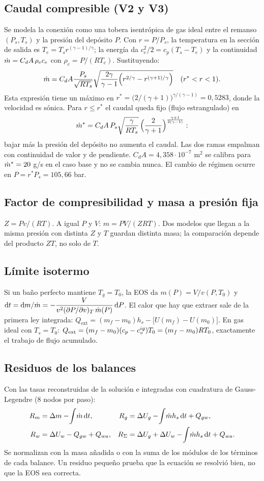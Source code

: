 \subsection{Caudal compresible (V2 y V3)}
Se modela la conexión como una tobera isentrópica de gas ideal entre el remanso $(P_s,T_s)$ y la presión
del depósito $P$. Con $r=P/P_s$, la temperatura en la sección de salida es $T_e=T_sr^{(\gamma-1)/\gamma}$; la
energía da $c_e^2/2=c_p(T_s-T_e)$ y la continuidad $\dot m=C_dA\,\rho_ec_e$ con $\rho_e=P/(RT_e)$. Sustituyendo:
\begin{equation}\label{eq:caudal}
\dot m=C_dA\frac{P_s}{\sqrt{RT_s}}\sqrt{\frac{2\gamma}{\gamma-1}\Big(r^{2/\gamma}-r^{(\gamma+1)/\gamma}\Big)}\quad (r^*<r<1).
\end{equation}
Esta expresión tiene un máximo en $r^*=\big(2/(\gamma+1)\big)^{\gamma/(\gamma-1)}=0{,}5283$, donde la velocidad
es sónica. Para $r\le r^*$ el caudal queda fijo (flujo estrangulado) en
\[
\dot m^*=C_dA\,P_s\sqrt{\frac{\gamma}{RT_s}}\,\Big(\frac{2}{\gamma+1}\Big)^{\frac{\gamma+1}{2(\gamma-1)}} :
\]
bajar más la presión del depósito no aumenta el caudal. Las dos ramas empalman con continuidad de valor y
de pendiente. $C_dA=4{,}358\cdot10^{-7}$ m$^2$ se calibra para $\dot m^*=20$ g/s en el caso base y no se cambia
nunca. El cambio de régimen ocurre en $P=r^*P_s=105{,}66$ bar.

\subsection{Factor de compresibilidad y masa a presión fija}
$Z=Pv/(RT)$. A igual $P$ y $V$: $m=PV/(ZRT)$. Dos modelos que llegan a la misma presión con distinta
$Z$ y $T$ guardan distinta masa; la comparación depende del producto $ZT$, no solo de $T$.

\subsection{Límite isotermo}
Si un baño perfecto mantiene $T_g=T_0$, la EOS da $m(P)=V/v(P,T_0)$ y
$\mathrm{d} t=\mathrm{d} m/\dot m=-\dfrac{V}{v^2(\partial P/\partial v)_T\,\dot m(P)}\,\mathrm{d} P$.
El calor que hay que extraer sale de la primera ley integrada:
$Q_{\text{ext}}=(m_f-m_0)h_s-\big[U(m_f)-U(m_0)\big]$. En gas ideal con $T_s=T_0$:
$Q_{\text{ext}}=(m_f-m_0)(c_p-c_v^{ig})T_0=(m_f-m_0)RT_0$, exactamente el trabajo de flujo acumulado.

\subsection{Residuos de los balances}
Con las tasas reconstruidas de la solución e integradas con cuadratura de Gauss-Legendre (8 nodos por paso):
\begin{align*}
R_m&=\Delta m-\!\int\!\dot m\,\mathrm{d} t, & R_g&=\Delta U_g-\!\int\!\dot m h_s\,\mathrm{d} t+Q_{gw},\\
R_w&=\Delta U_w-Q_{gw}+Q_{wa}, & R_\Sigma&=\Delta U_g+\Delta U_w-\!\int\!\dot m h_s\,\mathrm{d} t+Q_{wa}.
\end{align*}
Se normalizan con la masa añadida o con la suma de los módulos de los términos de cada balance.
Un residuo pequeño prueba que la ecuación se resolvió bien, no que la EOS sea correcta.

